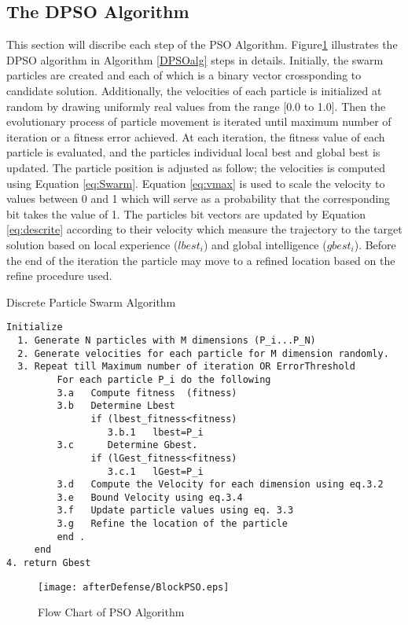 \subsection{The DPSO Algorithm}
\label{sec:ParticleSwarmAlgorithm} 

This section will discribe each step of the PSO Algorithm. Figure\ref{fig:BlockPSO} illustrates the DPSO algorithm in Algorithm \ref{DPSOalg} steps in details. Initially, the swarm particles are created and each of which is a binary vector crossponding to candidate solution. Additionally, the velocities of each particle is initialized at random by drawing uniformly real values from the range [0.0 to 1.0]. Then the evolutionary process of particle movement is iterated until maximum number of iteration or a fitness error achieved. At each iteration,  the fitness value of each particle is evaluated, and the particles individual local best and global best is updated. The particle position is adjusted as follow; the velocities is computed using Equation \ref{eq:Swarm}. Equation \ref{eq:vmax} is used to scale the velocity to values between 0 and 1 which will serve as a probability that the corresponding bit takes the value of 1. The particles bit vectors are updated by Equation \ref{eq:descrite} according to their velocity which measure the trajectory to the target solution based on local experience ($lbest_{i}$) and global intelligence ($gbest_{i}$). Before the end of the iteration the particle may move to a refined location based on the refine procedure used. 
\begin{algorithm}
\caption{ Discrete Particle Swarm Algorithm }
\label{DPSOalg}
\begin{verbatim}
Initialize 
  1. Generate N particles with M dimensions (P_i...P_N) 
  2. Generate velocities for each particle for M dimension randomly. 
  3. Repeat till Maximum number of iteration OR ErrorThreshold  
         For each particle P_i do the following 
         3.a   Compute fitness  (fitness)
         3.b   Determine Lbest  
               if (lbest_fitness<fitness)
                  3.b.1   lbest=P_i
         3.c      Determine Gbest.
               if (lGest_fitness<fitness)
                  3.c.1   lGest=P_i
         3.d   Compute the Velocity for each dimension using eq.3.2 
         3.e   Bound Velocity using eq.3.4
         3.f   Update particle values using eq. 3.3
         3.g   Refine the location of the particle
         end .
     end 
4. return Gbest
\end{verbatim}
  \end{algorithm}
  
\begin{figure}
	\centering
		\texttt{[image: afterDefense/BlockPSO.eps]}
	\caption{Flow Chart of PSO Algorithm }
	\label{fig:BlockPSO}
\end{figure}